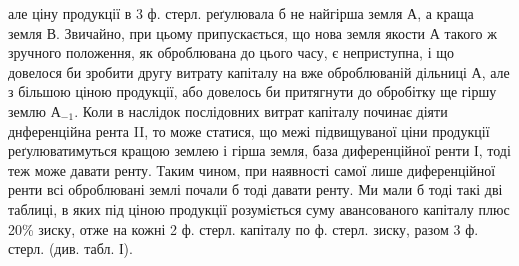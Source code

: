 \parcont{}  %
але ціну продукції в 3 ф. стерл. реґулювала б не найгірша земля $А$, а краща
земля В. Звичайно, при цьому припускається, що нова земля якости $А$ такого
ж зручного положення, як оброблювана до цього часу, є неприступна, і що довелося
би зробити другу витрату капіталу на вже оброблюваній дільниці $А$, але
з більшою ціною продукції, або довелось би притягнути до обробітку ще гіршу
землю $А_{-1}$. Коли в наслідок послідовних витрат капіталу починає діяти днференційна
рента II, то може статися, що межі підвищуваної ціни продукції реґулюватимуться
кращою землею і гірша земля, база диференційної ренти І, тоді
теж може давати ренту. Таким чином, при наявності самої лише диференційної
ренти всі оброблювані землі почали б тоді давати ренту. Ми мали б тоді такі
дві таблиці, в яких під ціною продукції розуміється суму авансованого капіталу
плюс 20\%  зиску, отже на кожні 2 ф. стерл. капіталу по  ф. стерл.
зиску, разом 3 ф. стерл. (див. табл. І).

